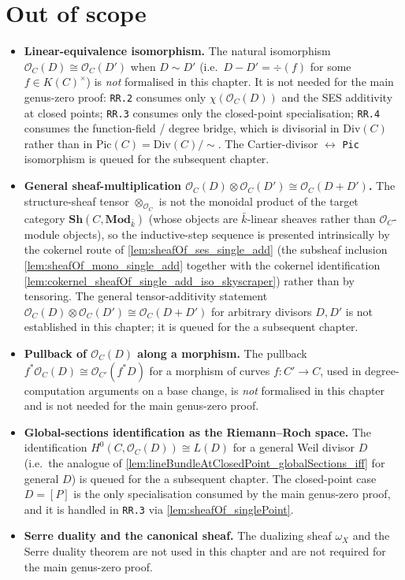 \section{Out of scope}

\begin{itemize}
  \item \textbf{Linear-equivalence isomorphism.} The natural
    isomorphism \(\mathcal O_C(D) \cong \mathcal O_C(D')\) when
    \(D \sim D'\) (i.e.\ \(D - D' = \div(f)\) for some
    \(f \in K(C)^{\times}\)) is \emph{not} formalised in this chapter.
    It is not needed for the main genus-zero proof: \texttt{RR.2}
    consumes only \(\chi(\mathcal O_C(D))\) and the SES additivity at
    closed points; \texttt{RR.3} consumes only the closed-point
    specialisation; \texttt{RR.4} consumes the function-field /
    degree bridge, which is divisorial in \(\mathrm{Div}(C)\) rather than
    in \(\mathrm{Pic}(C) = \mathrm{Div}(C) / \sim\). The
    Cartier-divisor \(\leftrightarrow\) \texttt{Pic} isomorphism is
    queued for the subsequent chapter.
  \item \textbf{General sheaf-multiplication
    $\mathcal O_C(D) \otimes \mathcal O_C(D') \cong \mathcal O_C(D +
    D')$.} The structure-sheaf tensor $\otimes_{\mathcal O_C}$ is not the
    monoidal product of the target category
    \(\mathbf{Sh}(C, \mathbf{Mod}_{\bar k})\) (whose objects are
    \(\bar k\)-linear sheaves rather than \(\mathcal O_C\)-module objects),
    so the inductive-step sequence is presented intrinsically by the
    cokernel route of \cref{lem:sheafOf_ses_single_add} (the subsheaf
    inclusion \cref{lem:sheafOf_mono_single_add} together with the cokernel
    identification \cref{lem:cokernel_sheafOf_single_add_iso_skyscraper})
    rather than by tensoring. The general tensor-additivity statement
    $\mathcal O_C(D) \otimes \mathcal O_C(D') \cong \mathcal O_C(D + D')$
    for arbitrary divisors \(D, D'\) is not established in this chapter;
    it is queued for the a subsequent chapter.
  \item \textbf{Pullback of \(\mathcal O_C(D)\) along a morphism.} The
    pullback \(f^* \mathcal O_C(D) \cong \mathcal O_{C'}(f^* D)\) for
    a morphism of curves \(f : C' \to C\), used in degree-computation
    arguments on a base change, is \emph{not} formalised in this
    chapter and is not needed for the main genus-zero proof.
  \item \textbf{Global-sections identification as the Riemann--Roch
    space.} The identification
    \(H^0(C, \mathcal O_C(D)) \cong L(D)\) for a general Weil divisor
    \(D\) (i.e.\ the analogue of
    \cref{lem:lineBundleAtClosedPoint_globalSections_iff} for general
    \(D\)) is queued for the a subsequent chapter. The closed-point
    case \(D = [P]\) is the only specialisation consumed by the
    main genus-zero proof, and it is handled in
    \texttt{RR.3} via \cref{lem:sheafOf_singlePoint}.
  \item \textbf{Serre duality and the canonical sheaf.} The dualizing
    sheaf \(\omega_X\) and the Serre duality theorem are not used in this
    chapter and are not required for the main genus-zero proof.
\end{itemize}
